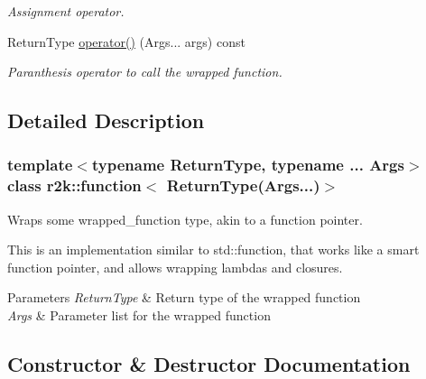 \begin{DoxyCompactItemize}
\begin{DoxyCompactList}\small\item\em Assignment operator. \end{DoxyCompactList}\item 
Return\+Type \mbox{\hyperlink{classr2k_1_1function_3_01_return_type_07_args_8_8_8_08_4_afe280ba8db5be8a1e1223c20e50ba5bc}{operator()}} (Args... args) const
\begin{DoxyCompactList}\small\item\em Paranthesis operator to call the wrapped function. \end{DoxyCompactList}\end{DoxyCompactItemize}


\subsection{Detailed Description}
\subsubsection*{template$<$typename Return\+Type, typename ... Args$>$\newline
class r2k\+::function$<$ Return\+Type(\+Args...)$>$}

Wraps some wrapped\+\_\+function type, akin to a function pointer. 

This is an implementation similar to std\+::function, that works like a smart function pointer, and allows wrapping lambdas and closures.


\begin{DoxyParams}{Parameters}
{\em Return\+Type} & Return type of the wrapped function \\
\hline
{\em Args} & Parameter list for the wrapped function \\
\hline
\end{DoxyParams}


\subsection{Constructor \& Destructor Documentation}
\mbox{\label{classr2k_1_1function_3_01_return_type_07_args_8_8_8_08_4_a6debd7d4891b02d8b6c2a911a0c6e189}} 
